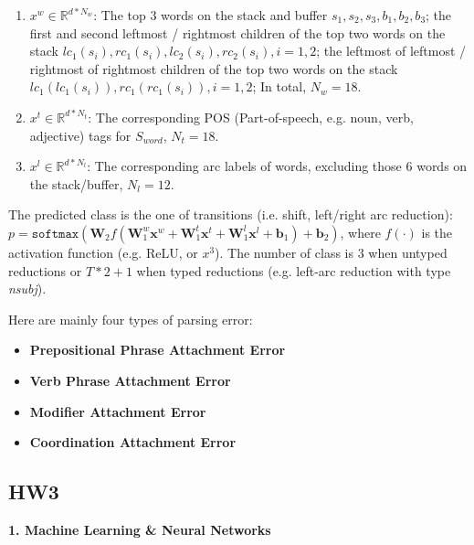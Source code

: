 \begin{enumerate}
	\item $x^{w} \in \mathbb{R}^{d * N_w}$: The top $3$ words on the stack and buffer $s_1, s_2, s_3, b_1, b_2, b_3$; the first and second leftmost / rightmost children of the top two words on the stack $lc_1(s_i), rc_1(s_i), lc_2(s_i), rc_2(s_i), i = 1, 2$; the
	leftmost of leftmost / rightmost of rightmost children of the top two words on the stack $lc_1(lc_1(s_i)), rc_1(rc_1(s_i)), i = 1, 2$; In total, $N_w = 18$.
	\item $x^{t} \in \mathbb{R}^{d * N_t}$: The corresponding POS (Part-of-speech, e.g. noun, verb, adjective) tags for $S_{word}$, $N_t = 18$.
	\item $x^{l} \in \mathbb{R}^{d * N_l}$:  The corresponding arc labels of words, excluding those $6$ words on the stack/buffer, $N_l = 12$.
\end{enumerate}


The predicted class is the one of transitions (i.e. shift, left/right arc reduction): $p = \texttt{softmax}(\bm{W}_2 f(\bm{W}_1^w \bm{x}^w + \bm{W}_1^t \bm{x}^t + \bm{W}_1^l \bm{x}^l + \bm{b}_1) + \bm{b}_2)$, where $f(\cdot)$ is the activation function (e.g. ReLU, or $x^3$).
The number of class is $3$ when untyped reductions or $T * 2 + 1$ when typed reductions (e.g. left-arc reduction with type \emph{nsubj}).

Here are mainly four types of parsing error:
\begin{itemize}
	\item \textbf{Prepositional Phrase Attachment Error}
	\item \textbf{Verb Phrase Attachment Error}
	\item \textbf{Modifier Attachment Error}
	\item \textbf{Coordination Attachment Error}
\end{itemize}

\subsection{HW3}
\textbf{1. Machine Learning \& Neural Networks}

